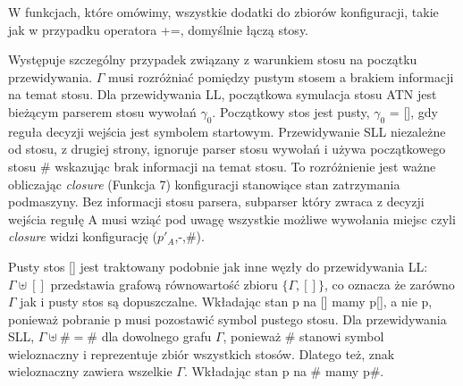\par
W funkcjach, które omówimy, wszystkie dodatki do zbiorów konfiguracji, takie jak w przypadku operatora +=, domyślnie łączą stosy.
\par
Występuje szczególny przypadek związany z warunkiem stosu na początku przewidywania.
$\Gamma$ musi rozróżniać pomiędzy pustym stosem a brakiem informacji na temat stosu.
Dla przewidywania LL, początkowa symulacja stosu ATN jest bieżącym parserem stosu wywołań $\gamma_0$.
Początkowy stos jest pusty, $\gamma_0$ = [], gdy reguła decyzji wejścia jest symbolem startowym.
Przewidywanie SLL niezależne od stosu, z drugiej strony, ignoruje parser stosu wywołań i używa początkowego
stosu \# wskazując brak informacji na temat stosu.
To rozróżnienie jest ważne obliczając \textit{closure} (Funkcja 7) konfiguracji
stanowiące stan zatrzymania podmaszyny. Bez informacji stosu parsera, subparser który zwraca
z decyzji wejścia regułę A musi wziąć pod uwagę wszystkie możliwe wywołania miejsc
czyli \textit{closure} widzi konfigurację ($p'_A$,-,\#).
\par
Pusty stos [] jest traktowany podobnie jak inne węzły do przewidywania LL:
$\Gamma \uplus []$ przedstawia grafową równowartość zbioru $\{\Gamma, []\}$,
co oznacza że zarówno $\Gamma$ jak i pusty stos są dopuszczalne.
Wkładając stan p na [] mamy p[], a nie p, ponieważ pobranie p musi pozostawić symbol pustego stosu.
Dla przewidywania SLL, $\Gamma \uplus \# = \#$ dla dowolnego grafu $\Gamma$, ponieważ \# stanowi symbol
wieloznaczny i reprezentuje zbiór wszystkich stosów. Dlatego też, znak wieloznaczny zawiera wszelkie
$\Gamma$. Wkładając stan p na \# mamy p\#.

